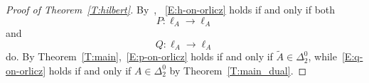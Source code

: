 \documentclass[nointlimits]{amsart}
\numberwithin{equation}{section}
\theoremstyle{plain}
\theoremstyle{definition}
\newcommand{\DTwo}{\Delta_2}
\newcommand{\DTwoZ}{\DTwo^0}
\newcommand{\tA}{\tilde{A}}
\begin{document}
\begin{proof}[Proof of Theorem~\ref{T:hilbert}]
    By~\cite[Theorem~3]{And:75},
    ~\eqref{E:h-on-orlicz} holds if and only if both 
    \begin{equation}\label{E:p-on-orlicz}
        P\colon \ell_A\to\ell_A
    \end{equation}
    and
    \begin{equation}\label{E:q-on-orlicz}
        Q\colon \ell_A\to\ell_A
    \end{equation}
    do.
    By Theorem~\ref{T:main},~\eqref{E:p-on-orlicz} holds if and only if $\tA\in\DTwoZ$, while~\eqref{E:q-on-orlicz} holds if and only if $A\in\DTwoZ$ by Theorem~\ref{T:main_dual}.  
\end{proof}


    

\end{document}
